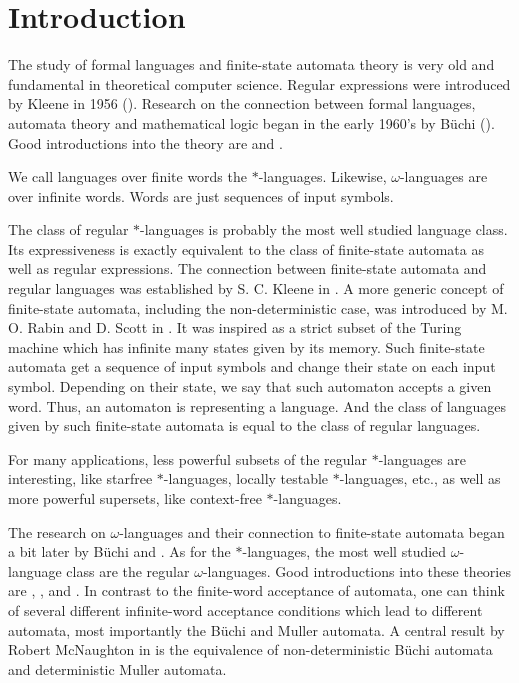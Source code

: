 
\section{Introduction}

The study of formal languages and finite-state automata theory is very old and fundamental in theoretical computer science. Regular expressions were introduced by Kleene in 1956 (\cite{Kleene56}). Research on the connection between formal languages, automata theory and mathematical logic began in the early 1960's by Büchi (\cite{Buchi60}). Good introductions into the theory are \cite{FinAutLogR109} and \cite{LangAutLogicR102}.

We call languages over finite words the $*$-languages. Likewise, $\omega$-languages are over infinite words. Words are just sequences of input symbols.

The class of regular $*$-languages is probably the most well studied language class. Its expressiveness is exactly equivalent to the class of finite-state automata as well as regular expressions. The connection between finite-state automata and regular languages was established by S. C. Kleene in \cite{Kleene56}. A more generic concept of finite-state automata, including the non-deterministic case, was introduced by M. O. Rabin and D. Scott in \cite{FinAutRabin59}. It was inspired as a strict subset of the Turing machine which has infinite many states given by its memory. Such finite-state automata get a sequence of input symbols and change their state on each input symbol. Depending on their state, we say that such automaton accepts a given word. Thus, an automaton is representing a language. And the class of languages given by such finite-state automata is equal to the class of regular languages.

For many applications, less powerful subsets of the regular $*$-languages are interesting, like starfree $*$-languages, locally testable $*$-languages, etc., as well as more powerful supersets, like context-free $*$-languages.

The research on $\omega$-languages and their connection to finite-state automata began a bit later by Büchi \cite{DecisionSOR111} and \cite{Muller63}. As for the $*$-languages, the most well studied $\omega$-language class are the regular $\omega$-languages. Good introductions into these theories are \cite{AutInfObjsR103}, \cite{InfCompR101}, \cite{OmLangR108} and \cite{InfWordsR110}. In contrast to the finite-word acceptance of automata, one can think of several different infinite-word acceptance conditions which lead to different automata, most importantly the Büchi and Muller automata. A central result by Robert McNaughton in \cite{McNaughton66} is the equivalence of non-deterministic Büchi automata and deterministic Muller automata.


